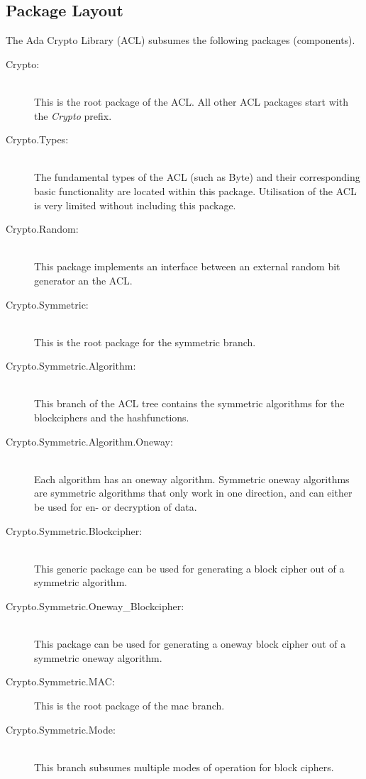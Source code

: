 
\subsection{Package Layout}
The Ada Crypto Library (ACL) subsumes the following packages (components).
\begin{description}
\item[Crypto:]\ \\ 
  This is the root package of the ACL.
  All other ACL packages start with the \textit{Crypto} prefix.
\item[Crypto.Types:] \ \\
  The fundamental types of the ACL (such as Byte) and their corresponding basic
  functionality are located within this package.
  Utilisation of the ACL is very limited without including this package.  
\item[Crypto.Random:] \ \\
  This package implements an interface between an external random bit generator
  an the ACL.
\item[Crypto.Symmetric:]\ \\
  This is the root package for the symmetric branch.
\item[Crypto.Symmetric.Algorithm:]\ \\
  This branch of the ACL tree contains the symmetric algorithms for the
  blockciphers and the hashfunctions.\\
\item[Crypto.Symmetric.Algorithm.Oneway:]\ \\
  Each algorithm has an oneway algorithm. Symmetric oneway algorithms are
  symmetric algorithms that only work in one direction, and can
  either be used for en- or decryption of data.
\item[Crypto.Symmetric.Blockcipher:]\ \\
  This generic package can be used for generating a block cipher out of
  a symmetric algorithm.
\item[Crypto.Symmetric.Oneway\_Blockcipher:]\ \\
  This package can be used for generating a oneway block cipher out of a
  symmetric oneway algorithm.
\item[Crypto.Symmetric.MAC:]
  This is the root package of the mac branch.
\item[Crypto.Symmetric.Mode:]\ \\
  This branch subsumes multiple modes of operation for block ciphers.

\end{description}
